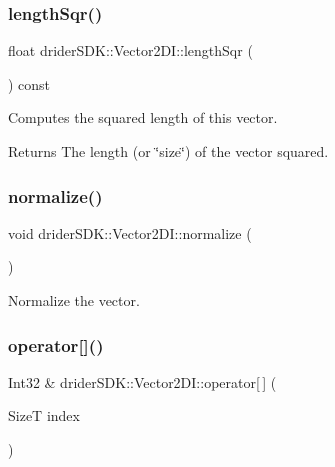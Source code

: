\subsubsection{\texorpdfstring{length\+Sqr()}{lengthSqr()}}
{\footnotesize\ttfamily float drider\+S\+D\+K\+::\+Vector2\+D\+I\+::length\+Sqr (\begin{DoxyParamCaption}{ }\end{DoxyParamCaption}) const}

Computes the squared length of this vector.

\begin{DoxyReturn}{Returns}
The length (or \char`\"{}size\char`\"{}) of the vector squared. 
\end{DoxyReturn}
\mbox{\label{classdrider_s_d_k_1_1_vector2_d_i_aa38e987f76d6043f734dbd777c3cdda9}} 
\subsubsection{\texorpdfstring{normalize()}{normalize()}}
{\footnotesize\ttfamily void drider\+S\+D\+K\+::\+Vector2\+D\+I\+::normalize (\begin{DoxyParamCaption}{ }\end{DoxyParamCaption})}

Normalize the vector. \mbox{\label{classdrider_s_d_k_1_1_vector2_d_i_a0a9232594d7e6bb774ce85adad91129b}} 
\subsubsection{\texorpdfstring{operator[]()}{operator[]()}\hspace{0.1cm}{\footnotesize\ttfamily [1/2]}}
{\footnotesize\ttfamily Int32 \& drider\+S\+D\+K\+::\+Vector2\+D\+I\+::operator\mbox{[}$\,$\mbox{]} (\begin{DoxyParamCaption}\item[{SizeT}]{index }\end{DoxyParamCaption})}


